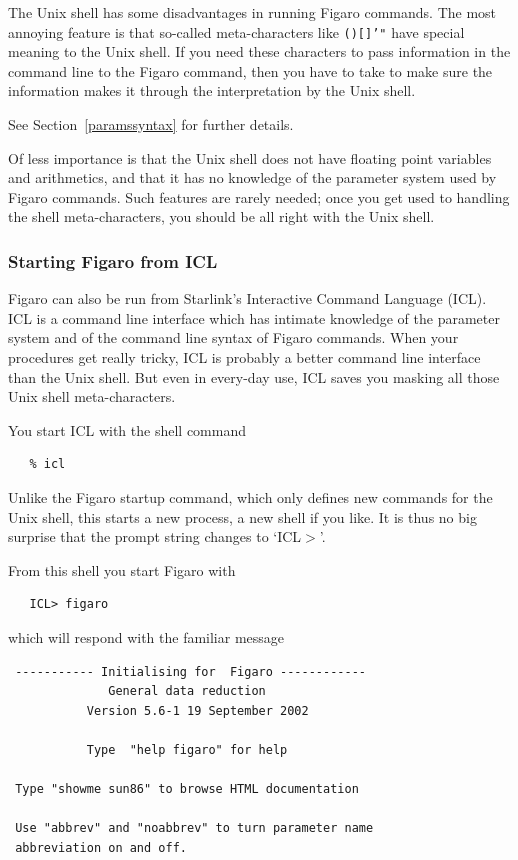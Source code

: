   The Unix shell has some disadvantages in running Figaro commands. The
   most annoying feature is that so-called meta-characters like
{\tt ()[]'"}
   have special meaning to the Unix shell. If you need these characters
   to pass information in the command line to the Figaro command, then
   you have to take
   to make sure the information makes it through the interpretation by
   the Unix shell.
\begin{latexonly}
   See Section~\ref{paramssyntax} for further details.
\end{latexonly}

   Of less importance is that the Unix shell does not have floating
   point variables and arithmetics, and that it has no knowledge of the
   parameter system used by Figaro commands. Such features are rarely
   needed; once you get used to handling the shell meta-characters,
   you should be all right with the Unix shell.

\subsubsection{Starting Figaro from ICL}

   Figaro can also be run from Starlink's Interactive Command Language
   (ICL).  ICL is a command line interface which has intimate knowledge of
   the parameter system and of the command line syntax of Figaro commands.
   When your procedures get really tricky, ICL is probably a better command
   line interface than the Unix shell.  But even in every-day use, ICL
   saves you masking all those Unix shell meta-characters.

   You start ICL with the shell command

\begin{verbatim}
   % icl
\end{verbatim}

   Unlike the Figaro startup command, which only defines new commands
   for the Unix shell, this starts a new process, a new shell if you
   like. It is thus no big surprise that the prompt string changes to
   `ICL$>$'.

   From this shell you start Figaro with

\begin{verbatim}
   ICL> figaro
\end{verbatim}

   which will respond with the familiar message

\begin{verbatim}
 ----------- Initialising for  Figaro ------------
              General data reduction
           Version 5.6-1 19 September 2002
 
           Type  "help figaro" for help
 
 Type "showme sun86" to browse HTML documentation
 
 Use "abbrev" and "noabbrev" to turn parameter name
 abbreviation on and off.
\end{verbatim}

